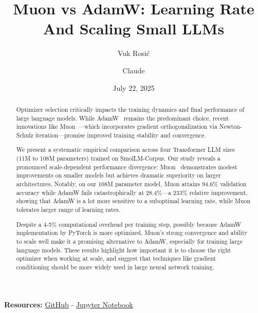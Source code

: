 \documentclass[11pt,a4paper]{article}
\title{\Large\bfseries Muon vs AdamW: Learning Rate And Scaling Small LLMs}
\author[1]{Vuk Rosić}
\author[2]{Claude}
\affil[1]{Óbuda University, \texttt{vukrosic1@gmail.com}}
\affil[2]{Anthropic}
\date{July 22, 2025}
\begin{document}
\maketitle

\begin{center}
\vspace{1em}
\noindent\textbf{Resources:} 
\href{https://github.com/vukrosic/muon-optimizer-research}{GitHub} \quad - \quad
\href{https://github.com/vukrosic/muon-optimizer-research/blob/main/muon_vs_adamw_for_llms.ipynb}{Jupyter Notebook}
\end{center}

\begin{abstract}
Optimizer selection critically impacts the training dynamics and final performance of large language models. While AdamW~\cite{loshchilov2017decoupled} remains the predominant choice, recent innovations like Muon~\cite{jordan2024muon}—which incorporates gradient orthogonalization via Newton-Schulz iteration—promise improved training stability and convergence. 

We present a systematic empirical comparison across four Transformer LLM sizes (11M to 108M parameters) trained on SmolLM-Corpus. Our study reveals a pronounced scale-dependent performance divergence: Muon~\cite{jordan2024muon} demonstrates modest improvements on smaller models but achieves dramatic superiority on larger architectures. Notably, on our 108M parameter model, Muon attains 94.6\% validation accuracy while AdamW fails catastrophically at 28.4\%—a 233\% relative improvement, showing that AdamW is a lot more sensitive to a suboptimal learning rate, while Muon tolerates larger range of learning rates.

Despite a 4-5\% computational overhead per training step, possibly because AdamW implementation by PyTorch is more optimized, Muon’s strong convergence and ability to scale well make it a promising alternative to AdamW, especially for training large language models. These results highlight how important it is to choose the right optimizer when working at scale, and suggest that techniques like gradient conditioning should be more widely used in large neural network training.
\end{abstract}
\end{document}
